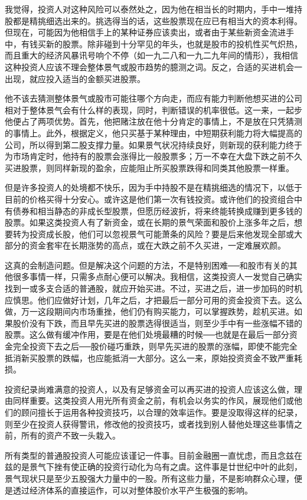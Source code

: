\documentclass[UTF8,a4paper,zihao=-4,fontset = windows]{ctexart} %
\begin{document}
我觉得，投资人对这种风险可以泰然处之，因为他在相当长的时期内，手中一堆持股都是精挑细选出来的。挑选得当的话，这些股票现在应已有相当大的资本利得。但现在，可能因为他相信手上的某种证券应该卖出，或者由于某些新资金流进手中，有钱买新的股票。除非碰到十分罕见的年头，也就是股市的投机性买气炽热，而且重大的经济风暴讯号响个不停（如一九二八和一九二九年间的情形），我相信这种投资人应该不理会整体景气或股市趋势的臆测之词。反之，合适的买进机会一出现，就应投入适当的金额买进股票。

他不该去猜测整体景气或股市可能往哪个方向走，而应有能力判断他想买进的公司相对于整体景气会有什么样的表现，同时，判断错误的机率很低。这一来，一起步他便占了两项优势。首先，他把赌注放在他十分肯定的事情上，不是放在只凭猜测的事情上。此外，根据定义，他只买基于某种理由，中短期获利能力将大幅提高的公司，所以得到第二股支撑力量。如果景气状况持续良好，则新现的获利能力终于为市场肯定时，他持有的股票会涨得比一般股票多；万一不幸在大盘下跌之前不久买进股票，则同样新现的盈余，应能阻止所买股票跌得和同类其他股票一样重。

但是许多投资人的处境都不快乐，因为手中持股不是在精挑细选的情况下，以低于目前的价格买得十分安心。或许这是他们第一次有钱投资。或许他们的投资组合中有债券和相当静态的非成长型股票，但愿历经波折，将来终能转换成赚到更多钱的股票。如果这类投资人有了新资金，或在长期的景气荣面和股价上涨多年之后，想要转为投资成长股，他们可以忽视景气可能萧条的风险？要是后来他发现全部或大部分的资金套牢在长期涨势的高点，或在大跌之前不久买进，一定难展欢颜。

这真的会制造问题。但是解决这个问题的方法，不是特别困难──和股市有关的其他很多事情一样，只需多点耐心便可以解决。我相信，这类投资人一发觉自己确实找到一或多支合适的普通股，就应开始买进。不过，买进之后，进一步加码的时机应慎思。他们应做好计划，几年之后，才把最后一部分可用的资金投资下去。这么做，万一这段期间内市场重挫，他们仍有购买能力，可以掌握跌势，趁机买进。如果股价没有下跌，而且早先买进的股票选得很适当，则至少手中有一些涨幅不错的股票。这么做有缓冲作用，要是在他们处境最糟的时候──也就是在最后一部分资金完全投资下去之后──股价碰巧重跌，则早先买进的股票的涨幅，即使不能完全抵消新买股票的跌幅，也应能抵消一大部分。这么一来，原始投资资金不致严重耗损。

投资纪录尚难满意的投资人，以及有足够资金可以再买进的投资人应该这么做，理由同样重要。这类投资人用光所有资金之前，有机会以务实的作风，展现他们或他们的顾问擅长于运用各种投资技巧，以合理的效率运作。要是没取得这样的纪录，则至少在投资人获得警讯，修改他的投资技巧，或者找到别人替他处理这些事情之前，所有的资产不致一头栽入。

所有类型的普通股投资人可能应该谨记一件事。目前金融圈一直忧虑，而且念兹在兹的是景气下挫有使正确的投资行动化为乌有之虞。这件事是廿世纪中叶的此刻，景气现状只是至少五股强大力量中的一股。所有这些力量，不是影响群众心理，便是透过经济体系的直接运作，可以对整体股价水平产生极强的影响。
\end{document}
